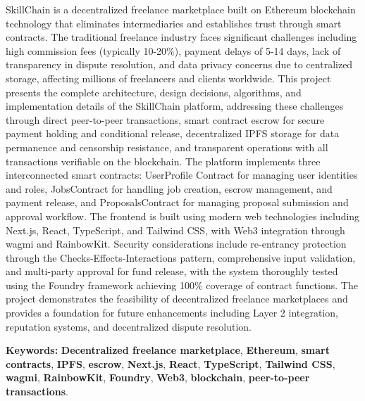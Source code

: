 SkillChain is a decentralized freelance marketplace built on Ethereum blockchain technology that eliminates intermediaries and establishes trust through smart contracts. The traditional freelance industry faces significant challenges including high commission fees (typically 10-20\%), payment delays of 5-14 days, lack of transparency in dispute resolution, and data privacy concerns due to centralized storage, affecting millions of freelancers and clients worldwide. This project presents the complete architecture, design decisions, algorithms, and implementation details of the SkillChain platform, addressing these challenges through direct peer-to-peer transactions, smart contract escrow for secure payment holding and conditional release, decentralized IPFS storage for data permanence and censorship resistance, and transparent operations with all transactions verifiable on the blockchain. The platform implements three interconnected smart contracts: UserProfile Contract for managing user identities and roles, JobsContract for handling job creation, escrow management, and payment release, and ProposalsContract for managing proposal submission and approval workflow. The frontend is built using modern web technologies including Next.js, React, TypeScript, and Tailwind CSS, with Web3 integration through wagmi and RainbowKit. Security considerations include re-entrancy protection through the Checks-Effects-Interactions pattern, comprehensive input validation, and multi-party approval for fund release, with the system thoroughly tested using the Foundry framework achieving 100\% coverage of contract functions. The project demonstrates the feasibility of decentralized freelance marketplaces and provides a foundation for future enhancements including Layer 2 integration, reputation systems, and decentralized dispute resolution.

\vspace{1em}
\noindent\textbf{Keywords:}  \textbf{Decentralized
freelance marketplace}, \textbf{Ethereum},
\textbf{smart contracts}, \textbf{IPFS},
\textbf{escrow}, \textbf{Next.js}, \textbf{React},
\textbf{TypeScript}, \textbf{Tailwind CSS},
\textbf{wagmi}, \textbf{RainbowKit},
\textbf{Foundry}, \textbf{Web3},
\textbf{blockchain}, \textbf{peer-to-peer
transactions}.
